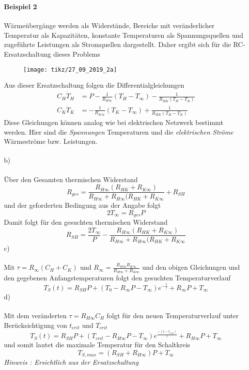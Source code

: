 \newpage
\noindent
\textbf{Beispiel 2}\\ \\
Wärmeübergänge werden als Widerstände, Bereiche mit veränderlicher Temperatur als Kapazitäten, konstante Temperaturen als Spannungsquellen und zugeführte Leistungen als Stromquellen dargestellt. Daher ergibt sich für die RC-Ersatzschaltung dieses Problems
\begin{figure}[h]
	\centering
	\texttt{[image: tikz/27\_09\_2019\_2a]}
\end{figure}
Aus dieser Ersatzschaltung folgen die Differentialgleichungen
\begin{align*}
	C_H\dot{T}_H &= P - \frac{1}{R_{H\infty}}(T_H - T_\infty) - \frac{1}{R_{HK}(T_H - T_K)} \\
	C_K\dot{T}_K &= -\frac{1}{R_{K\infty}}(T_K - T_\infty) + \frac{1}{R_{HK}(T_H - T_K)}
\end{align*}
Diese Gleichungen können analog wie bei elektrischen Netzwerk bestimmt werden. Hier sind die \textit{Spannungen} Temperaturen und die \textit{elektrischen Ströme} Wärmeströme bzw. Leistungen.\\ \\
b)\\ \\
Über den Gesamten thermischen Widerstand
\[
	R_{ges} = \frac{R_{H\infty}(R_{HK} + R_{K\infty})}{R_{H\infty} + R_{H\infty}(R_{HK} + R_{K\infty}} + R_{SH}
\]
und der geforderten Bedingung aus der Angabe folgt
\[
	2T_\infty = R_{ges}P
\]
Damit folgt für den gesuchten thermischen Widerstand
\[
	R_{SH} = \frac{2T_\infty}{P} - \frac{R_{H\infty}(R_{HK} + R_{K\infty})}{R_{H\infty} + R_{H\infty}(R_{HK} + R_{K\infty}}
\]
\newpage
\noindent
c)\\ \\
Mit $\tau = R_\infty(C_H + C_K)$ und $R_\infty = \frac{R_{H\infty}R_{K\infty}}{R_{H\infty}+R_{K\infty}}$ und den obigen Gleichungen und den gegebenen Anfangstemperaturen folgt den gesuchten Temperaturverlauf
\[
	T_S(t) = R_{SH}P + (T_0 - R_\infty P - T_\infty)e^{-\frac{t}{\tau}} + R_{\infty}P + T_\infty
\]
d)\\ \\
Mit dem veränderten $\tau = R_{H\infty}C_H$ folgt für den neuen Temperaturverlauf unter Berücksichtigung von $t_{crit}$ und $T_{crit}$
\[
	T_S(t) = R_{SH}P + (T_{crit} - R_{H\infty} P - T_\infty)e^{\frac{-(t - t_{crit})}{\tau}} + R_{H\infty}P + T_\infty
\]
und somit lautet die maximale Temperatur für den Schaltkreis
\[
	T_{S,max} = (R_{SH} + R_{H\infty})P + T_\infty
\]
\textit{Hinweis : Ersichtlich aus der Ersatzschaltung} \\ \\